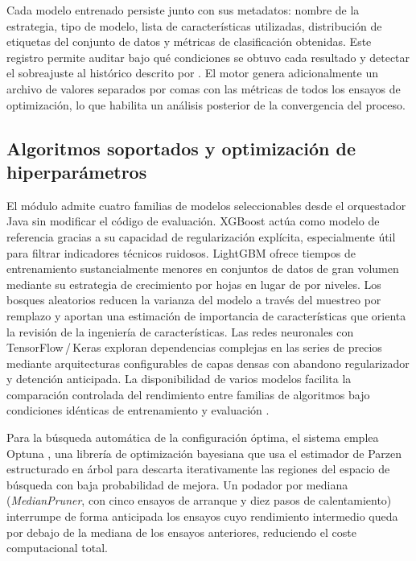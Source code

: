 Cada modelo entrenado persiste junto con sus metadatos: nombre de la
estrategia, tipo de modelo, lista de características utilizadas, distribución
de etiquetas del conjunto de datos y métricas de clasificación obtenidas. Este
registro permite auditar bajo qué condiciones se obtuvo cada resultado y
detectar el sobreajuste al histórico descrito por
\textcite{lopez_de_prado_advances_2018}. El motor genera adicionalmente un
archivo de valores separados por comas con las métricas de todos los ensayos
de optimización, lo que habilita un análisis posterior de la convergencia del
proceso.

\subsection{Algoritmos soportados y optimización de hiperparámetros}

El módulo admite cuatro familias de modelos seleccionables desde el orquestador
Java sin modificar el código de evaluación. XGBoost \parencite{chen_xgboost_2016}
actúa como modelo de referencia gracias a su capacidad de regularización
explícita, especialmente útil para filtrar indicadores técnicos ruidosos.
LightGBM \parencite{ke_lightgbm_2017} ofrece tiempos de entrenamiento
sustancialmente menores en conjuntos de datos de gran volumen mediante su
estrategia de crecimiento por hojas en lugar de por niveles. Los bosques
aleatorios reducen la varianza del modelo a través del muestreo por remplazo y
aportan una estimación de importancia de características que orienta la
revisión de la ingeniería de características. Las redes neuronales con
TensorFlow\,/\,Keras \parencite{goodfellow_deep_2016} exploran dependencias
complejas en las series de precios mediante arquitecturas configurables de capas
densas con abandono regularizador y detención anticipada. La disponibilidad de
varios modelos facilita la comparación controlada del rendimiento entre familias
de algoritmos bajo condiciones idénticas de entrenamiento y evaluación
\parencite{feurer_hyperparameter_2019}.

Para la búsqueda automática de la configuración óptima, el sistema emplea
Optuna \parencite{feurer_hyperparameter_2019}, una librería de optimización
bayesiana que usa el estimador de Parzen estructurado en árbol para descarta
iterativamente las regiones del espacio de búsqueda con baja probabilidad de
mejora. Un podador por mediana (\textit{MedianPruner}, con cinco ensayos de
arranque y diez pasos de calentamiento) interrumpe de forma anticipada los
ensayos cuyo rendimiento intermedio queda por debajo de la mediana de los
ensayos anteriores, reduciendo el coste computacional total.

